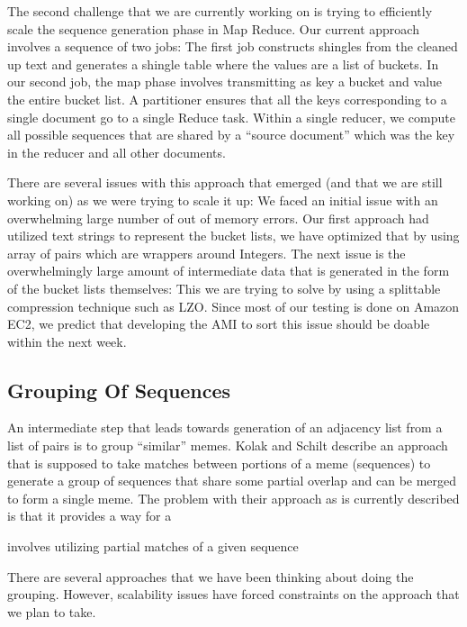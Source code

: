 \documentclass{acm_proc_article-sp}
\begin{document}
 The second challenge that we are currently working on is trying to efficiently scale the sequence generation phase in Map Reduce. Our current approach involves a sequence of two jobs: The first job constructs shingles from the cleaned up text and generates a shingle table where the values are a list of buckets. In our second job, the map phase involves transmitting as key a bucket and value the entire bucket list. A partitioner ensures that all the keys corresponding to a single document go to a single Reduce task. Within a single reducer, we compute all possible sequences that are shared by a ``source document'' which was the key in the reducer and all other documents. 
 
 There are several issues with this approach that emerged (and that we are still working on) as we were trying to scale it up: We faced an initial issue with an overwhelming large number of out of memory errors. Our first approach had utilized text strings to represent the bucket lists, we have optimized that by using array of pairs which are wrappers around Integers. The next issue is the overwhelmingly large amount of intermediate data that is generated in the form of the bucket lists themselves: This we are trying to solve by using a splittable compression technique such as LZO. Since most of our testing is done on Amazon EC2, we predict that developing the AMI to sort this issue should be doable within the next week. 
 
 \subsection{Grouping Of Sequences}
 An intermediate step that leads towards generation of an adjacency list from a list of pairs is to group ``similar'' memes. Kolak and Schilt \cite{kolak2008generating} describe an approach that is supposed to take matches between portions of a meme (sequences) to generate a group of sequences that share some partial overlap and can be merged to form a single meme. The problem with their approach as is currently described is that it provides a way for a 
 
  involves utilizing partial matches of a given sequence
 
 There are several approaches that we have been thinking about doing the grouping. However, scalability issues have forced constraints on the approach that we plan to take. 
 
 
  
\end{document}
